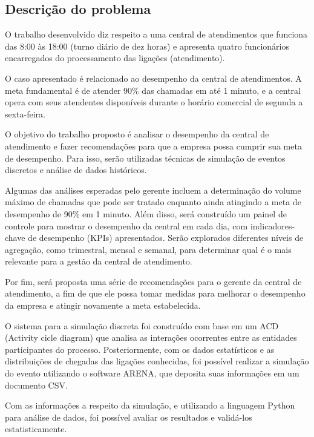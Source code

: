 \subsection{Descrição do problema}
\label{section: descricao}
O trabalho desenvolvido diz respeito a uma central de atendimentos que funciona das 8:00 às 18:00 (turno diário de dez horas) e apresenta quatro funcionários encarregados do processamento das ligações (atendimento).

O caso apresentado é relacionado ao desempenho da central de atendimentos. A meta fundamental é de atender 90\% das chamadas em até 1 minuto, e a central opera com seus atendentes disponíveis durante o horário comercial de segunda a sexta-feira.

O objetivo do trabalho proposto é analisar o desempenho da central de atendimento e fazer recomendações para que a empresa possa cumprir sua meta de desempenho. Para isso, serão utilizadas técnicas de simulação de eventos discretos e análise de dados históricos.

Algumas das análises esperadas pelo gerente incluem a determinação do volume máximo de chamadas que pode ser tratado enquanto ainda atingindo a meta de desempenho de 90\% em 1 minuto. Além disso, será construído um painel de controle para mostrar o desempenho da central em cada dia, com indicadores-chave de desempenho (KPIs) apresentados. Serão explorados diferentes níveis de agregação, como trimestral, mensal e semanal, para determinar qual é o mais relevante para a gestão da central de atendimento.

Por fim, será proposta uma série de recomendações para o gerente da central de atendimento, a fim de que ele possa tomar medidas para melhorar o desempenho da empresa e atingir novamente a meta estabelecida.

O sistema para a simulação discreta foi construído com base em um ACD (Activity cicle diagram) que analisa as interações ocorrentes entre as entidades participantes do processo. Posteriormente, com os dados estatísticos e as distribuições de chegadas das ligações conhecidas, foi possível realizar a simulação do evento utilizando o software ARENA, que deposita suas informações em um documento CSV. 

Com as informações a respeito da simulação, e utilizando a linguagem Python para análise de dados, foi possível avaliar os resultados e validá-los estatisticamente.

